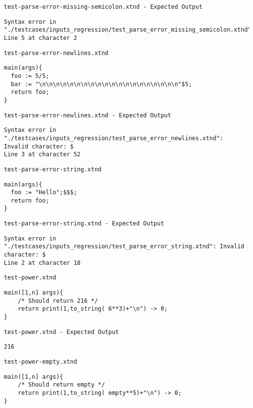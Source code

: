 \medskip \noindent \texttt{test-parse-error-missing-semicolon.xtnd - Expected Output}


\begin{lstlisting}
Syntax error in "./testcases/inputs_regression/test_parse_error_missing_semicolon.xtnd": 
Line 5 at character 2
\end{lstlisting}


\medskip \noindent \texttt{test-parse-error-newlines.xtnd}


\begin{lstlisting}
main(args){
  foo := 5/5;
  bar := "\n\n\n\n\n\n\n\n\n\n\n\n\n\n\n\n\n\n\n\n"$5;
  return foo;
}
\end{lstlisting}


\medskip \noindent \texttt{test-parse-error-newlines.xtnd - Expected Output}


\begin{lstlisting}
Syntax error in "./testcases/inputs_regression/test_parse_error_newlines.xtnd": Invalid character: $
Line 3 at character 52
\end{lstlisting}


\medskip \noindent \texttt{test-parse-error-string.xtnd}


\begin{lstlisting}
main(args){
  foo := "Hello";$$$;
  return foo;
}
\end{lstlisting}


\medskip \noindent \texttt{test-parse-error-string.xtnd - Expected Output}


\begin{lstlisting}
Syntax error in "./testcases/inputs_regression/test_parse_error_string.xtnd": Invalid character: $
Line 2 at character 18
\end{lstlisting}


\medskip \noindent \texttt{test-power.xtnd}


\begin{lstlisting}
main([1,n] args){
	/* Should return 216 */
	return print(1,to_string( 6**3)+"\n") -> 0;
}
\end{lstlisting}


\medskip \noindent \texttt{test-power.xtnd - Expected Output}


\begin{lstlisting}
216
\end{lstlisting}


\medskip \noindent \texttt{test-power-empty.xtnd}


\begin{lstlisting}
main([1,n] args){
	/* Should return empty */
	return print(1,to_string( empty**5)+"\n") -> 0;
}
\end{lstlisting}


